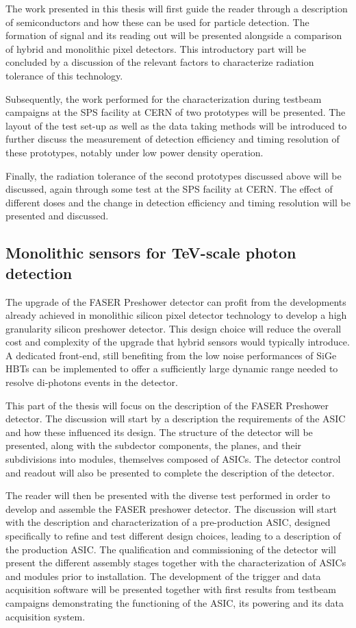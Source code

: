 The work presented in this thesis will first guide the reader through a description of semiconductors and how these can be used for particle detection. The formation of signal and its reading out will be presented alongside a comparison of hybrid and monolithic pixel detectors. This introductory part will be concluded by a discussion of the relevant factors to characterize radiation tolerance of this technology. 

Subsequently, the work performed for the characterization during testbeam campaigns at the SPS facility at CERN of two prototypes will be presented. The layout of the test set-up as well as the data taking methods will be introduced to further discuss the measurement of detection efficiency and timing resolution of these prototypes, notably under low power density operation.   

Finally, the radiation tolerance of the second prototypes discussed above will be discussed, again through some test at the SPS facility at CERN. The effect of different doses and the change in detection efficiency and timing resolution will be presented and discussed. 


\subsection{Monolithic sensors for TeV-scale photon detection }
The upgrade of the FASER Preshower detector can profit from the developments already achieved in monolithic silicon pixel detector technology to develop a high granularity silicon preshower detector. This design choice will reduce the overall cost and complexity of the upgrade that hybrid sensors would typically introduce. A dedicated front-end, still benefiting from the low noise performances of SiGe HBTs can be implemented to offer a sufficiently large dynamic range needed to resolve di-photons events in the detector. 

This part of the thesis will focus on the description of the FASER Preshower detector. The discussion will start by a description the requirements of the ASIC and how these influenced its design. The structure of the detector will be presented, along with the subdector components, the planes, and their subdivisions into modules, themselves composed of ASICs. The detector control and readout will also be presented to complete the description of the detector. 

The reader will then be presented with the diverse test performed in order to develop and assemble the FASER preshower detector. The discussion will start with the description and characterization of a pre-production ASIC, designed specifically to refine and test different design choices, leading to a description of the production ASIC. The qualification and commissioning of the detector will present the different assembly stages together with the characterization of ASICs and modules prior to installation. The development of the trigger and data acquisition software will be presented together with first results from testbeam campaigns demonstrating the functioning of the ASIC, its powering and its data acquisition system. 
